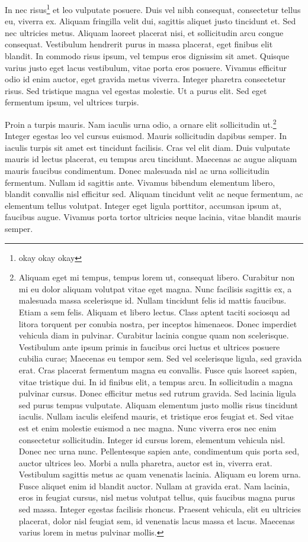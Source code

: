 \documentclass[11pt,twoside]{article}
\begin{document}
In nec risus\footnote{okay okay okay}
et leo vulputate posuere. Duis vel nibh consequat, consectetur tellus eu, viverra ex. Aliquam fringilla velit dui, sagittis aliquet justo tincidunt et. Sed nec ultricies metus. Aliquam laoreet placerat nisi, et sollicitudin arcu congue consequat. Vestibulum hendrerit purus in massa placerat, eget finibus elit blandit. In commodo risus ipsum, vel tempus eros dignissim sit amet. Quisque varius justo eget lacus vestibulum, vitae porta eros posuere. Vivamus efficitur odio id enim auctor, eget gravida metus viverra. Integer pharetra consectetur risus. Sed tristique magna vel egestas molestie. Ut a purus elit. Sed eget fermentum ipsum, vel ultrices turpis.

Proin a turpis mauris. Nam iaculis urna odio, a ornare elit sollicitudin ut.\footnote{Aliquam eget mi tempus, tempus lorem ut, consequat libero. Curabitur non mi eu dolor aliquam volutpat vitae eget magna. Nunc facilisis sagittis ex, a malesuada massa scelerisque id. Nullam tincidunt felis id mattis faucibus. Etiam a sem felis. Aliquam et libero lectus. Class aptent taciti sociosqu ad litora torquent per conubia nostra, per inceptos himenaeos. Donec imperdiet vehicula diam in pulvinar. Curabitur lacinia congue quam non scelerisque. Vestibulum ante ipsum primis in faucibus orci luctus et ultrices posuere cubilia curae; Maecenas eu tempor sem. Sed vel scelerisque ligula, sed gravida erat. Cras placerat fermentum magna eu convallis. Fusce quis laoreet sapien, vitae tristique dui. In id finibus elit, a tempus arcu. In sollicitudin a magna pulvinar cursus. Donec efficitur metus sed rutrum gravida. Sed lacinia ligula sed purus tempus vulputate. Aliquam elementum justo mollis risus tincidunt iaculis. Nullam iaculis eleifend mauris, et tristique eros feugiat et. Sed vitae est et enim molestie euismod a nec magna. Nunc viverra eros nec enim consectetur sollicitudin. Integer id cursus lorem, elementum vehicula nisl. Donec nec urna nunc. Pellentesque sapien ante, condimentum quis porta sed, auctor ultrices leo. Morbi a nulla pharetra, auctor est in, viverra erat. Vestibulum sagittis metus ac quam venenatis lacinia. Aliquam eu lorem urna. Fusce aliquet enim id blandit auctor. Nullam at gravida erat. Nam lacinia, eros in feugiat cursus, nisl metus volutpat tellus, quis faucibus magna purus sed massa. Integer egestas facilisis rhoncus. Praesent vehicula, elit eu ultricies placerat, dolor nisl feugiat sem, id venenatis lacus massa et lacus. Maecenas varius lorem in metus pulvinar mollis.} Integer egestas leo vel cursus euismod. Mauris sollicitudin dapibus semper. In iaculis turpis sit amet est tincidunt facilisis. Cras vel elit diam. Duis vulputate mauris id lectus placerat, eu tempus arcu tincidunt. Maecenas ac augue aliquam mauris faucibus condimentum. Donec malesuada nisl ac urna sollicitudin fermentum. Nullam id sagittis ante. Vivamus bibendum elementum libero, blandit convallis nisl efficitur sed. Aliquam tincidunt velit ac neque fermentum, ac elementum tellus volutpat. Integer eget ligula porttitor, accumsan ipsum at, faucibus augue. Vivamus porta tortor ultricies neque lacinia, vitae blandit mauris semper.
\end{document}
